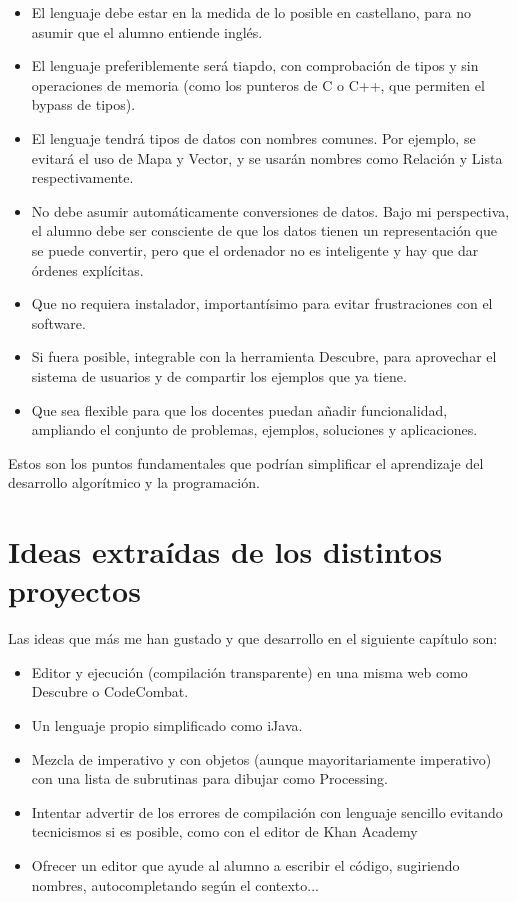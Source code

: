 \documentclass{report}
\begin{document}
	\begin{itemize}
		\item El lenguaje debe estar en la medida de lo posible en castellano, para no asumir que el alumno entiende inglés.
		\item El lenguaje preferiblemente será tiapdo, con comprobación de tipos \cite{statictypecheck}\cite{typesafety} y sin operaciones de memoria \cite{memorysafety} (como los punteros de C o C++, que permiten el bypass de tipos). 
		\item El lenguaje tendrá tipos de datos con nombres comunes. Por ejemplo, se evitará el uso de Mapa y Vector, y se usarán nombres como Relación y Lista respectivamente.
		\item No debe asumir automáticamente conversiones de datos. Bajo mi perspectiva, el alumno debe ser consciente de que los datos tienen un representación que se puede convertir, pero que el ordenador no es inteligente y hay que dar órdenes explícitas.
		\item Que no requiera instalador, importantísimo para evitar frustraciones con el software. 
		\item Si fuera posible, integrable con la herramienta Descubre, para aprovechar el sistema de usuarios y de compartir los ejemplos que ya tiene.
		\item Que sea flexible para que los docentes puedan añadir funcionalidad, ampliando el conjunto de problemas, ejemplos, soluciones y aplicaciones.
	\end{itemize} 
	
	Estos son los puntos fundamentales que podrían simplificar el aprendizaje del desarrollo algorítmico y la programación.
	
	\section{Ideas extraídas de los distintos proyectos}
	
	Las ideas que más me han gustado y que desarrollo en el siguiente capítulo son:
	
	\begin{itemize}
		\item Editor y ejecución (compilación transparente) en una misma web como Descubre o CodeCombat.
		\item Un lenguaje propio simplificado como iJava. 
		\item Mezcla de imperativo y con objetos (aunque mayoritariamente imperativo) con una lista de subrutinas para dibujar como Processing.
		\item Intentar advertir de los errores de compilación con lenguaje sencillo evitando tecnicismos si es posible, como con el editor de Khan Academy
		\item Ofrecer un editor que ayude al alumno a escribir el código, sugiriendo nombres, autocompletando según el contexto...
	\end{itemize}
	
\end{document}
